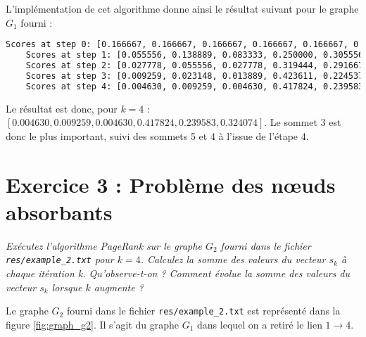 L'implémentation de cet algorithme donne ainsi le résultat suivant pour le graphe $G_1$ fourni :

\begin{minipage}{\dimexpr\linewidth-20pt}
\begin{lstlisting}[language=bash, caption={Résultat de l'algorithme PageRank sur le graphe $G_1$ fourni, pour $k = 4$.}]
    Scores at step 0: [0.166667, 0.166667, 0.166667, 0.166667, 0.166667, 0.166667]
    Scores at step 1: [0.055556, 0.138889, 0.083333, 0.250000, 0.305556, 0.166667]
    Scores at step 2: [0.027778, 0.055556, 0.027778, 0.319444, 0.291667, 0.277778]
    Scores at step 3: [0.009259, 0.023148, 0.013889, 0.423611, 0.224537, 0.305556]
    Scores at step 4: [0.004630, 0.009259, 0.004630, 0.417824, 0.239583, 0.324074]
\end{lstlisting}
\end{minipage}

Le résultat est donc, pour $k = 4$ : $[0.004630, 0.009259, 0.004630, 0.417824, 0.239583, 0.324074]$. Le sommet 3 est donc le plus important, suivi des sommets 5 et 4 à l'issue de l'étape 4.

\section{Exercice 3 : Problème des nœuds absorbants}

\textit{Exécutez l'algorithme PageRank sur le graphe $G_2$ fourni dans le fichier \texttt{res/example\_2.txt} pour $k = 4$. Calculez la somme des valeurs du vecteur $s_k$ à chaque itération k. Qu'observe-t-on ? Comment évolue la somme des valeurs du vecteur $s_k$ lorsque $k$ augmente ?}

Le graphe $G_2$ fourni dans le fichier \texttt{res/example\_2.txt} est représenté dans la figure \ref{fig:graph_g2}. Il s'agit du graphe $G_1$ dans lequel on a retiré le lien $1 \rightarrow 4$.

